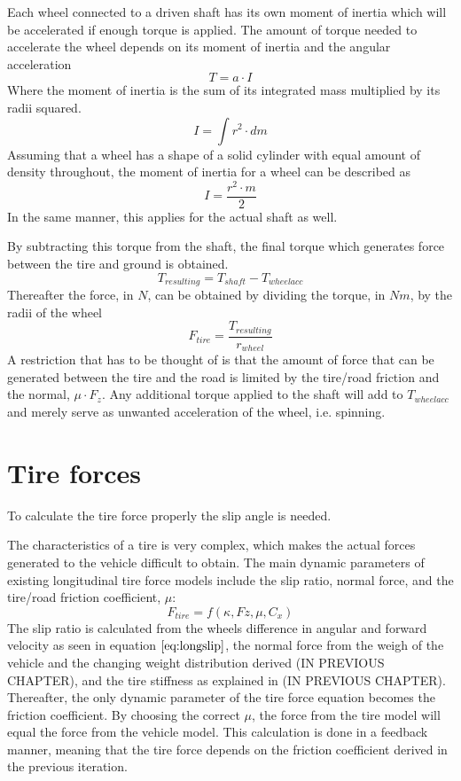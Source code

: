 Each wheel connected to a driven shaft has its own moment of inertia which will be accelerated if enough torque is applied. The amount of torque needed to accelerate the wheel depends on its moment of inertia and the angular acceleration
\begin{equation}
	T = a \cdot I
\end{equation}
Where the moment of inertia is the sum of its integrated mass multiplied by its radii squared. 
\begin{equation}
	I = \int r^2 \cdot dm
\end{equation}
Assuming that a wheel has a shape of a solid cylinder with equal amount of density throughout, the moment of inertia for a wheel can be described as
\begin{equation}
	I = \dfrac{r^2 \cdot m}{2} 
\end{equation}
In the same manner, this applies for the actual shaft as well. 

By subtracting this torque from the shaft, the final torque which generates force between the tire and ground is obtained.
\begin{equation}
	T_{resulting} = T_{shaft} - T_{wheel acc}
\end{equation}
Thereafter the force, in $ N $, can be obtained by dividing the torque, in $ Nm $, by the radii of the wheel
\begin{equation}
	F_{tire} = \frac{T_{resulting}}{r_{wheel}}
\end{equation}
A restriction that has to be thought of is that the amount of force that can be generated between the tire and the road is limited by the tire/road friction and the normal, $ \mu \cdot F_{z} $. Any additional torque applied to the shaft will add to $ T_{wheelacc} $ and merely serve as unwanted acceleration of the wheel, i.e. spinning.


\section{Tire forces}
To calculate the tire force properly the slip angle is needed. 

The characteristics of a tire is very complex, which makes the actual forces generated to the vehicle  difficult to obtain. The main dynamic parameters of existing longitudinal tire force models include the slip ratio, normal force, and the tire/road friction coefficient, $ \mu $:
\begin{equation}
F_{tire} = f(\kappa, Fz, \mu, C_{x})
\end{equation}
The slip ratio is calculated from the wheels difference in angular and forward velocity as seen in equation $ \ref{eq:longslip} $, the normal force from the weigh of the vehicle and the changing weight distribution derived (IN PREVIOUS CHAPTER), and the tire stiffness as explained  in (IN PREVIOUS CHAPTER). Thereafter, the only dynamic parameter of the tire force equation becomes the friction coefficient. By choosing the correct $ \mu $, the force from the tire model will equal the force from the vehicle model. This calculation is done in a feedback manner, meaning that the tire force depends on the friction coefficient derived in the previous iteration.

